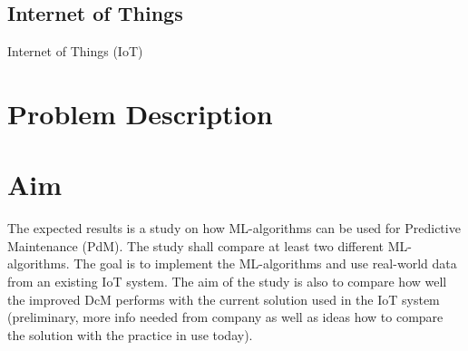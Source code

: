 \subsection{Internet of Things}
Internet of Things (IoT)

\section{Problem Description}
\label{sec:problem-description}

\section{Aim}
\label{sec:aim}
The expected results is a study on how ML-algorithms can be used for Predictive Maintenance (PdM).
The study shall compare at least two different ML-algorithms.
The goal is to implement the ML-algorithms and use real-world data from an existing IoT system.
The aim of the study is also to compare how well the improved DcM performs with the current solution used in the IoT system (preliminary, more info needed from company as well as ideas how to compare the solution with the practice in use today).



